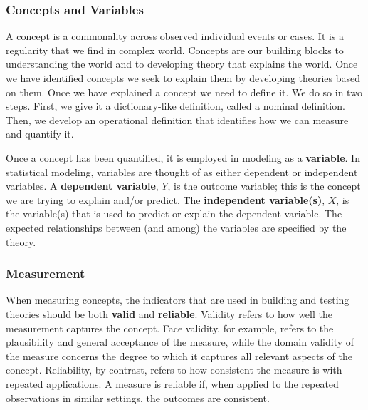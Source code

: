 \documentclass[11pt,openany]{book}\usepackage[]{graphicx}\usepackage[]{color}
\begin{document}
\subsubsection{Concepts and Variables}
A concept is a commonality across observed individual events or cases. It is a regularity that we find in complex world. Concepts are our  building blocks to understanding the world and to developing theory that explains the world. Once we have identified concepts  we seek to explain them by developing theories based on them. Once we have explained a concept we need to define it. We do so in two steps. First, we give it a dictionary-like definition, called a nominal definition. Then, we develop an operational definition that identifies how we can measure and quantify it. 

Once a concept has been quantified, it is employed in modeling as a \textbf{variable}. In statistical modeling, variables are thought of as either dependent or independent variables. A \textbf{dependent variable}, $Y$, is the outcome variable; this is the concept we are trying to explain and/or predict. The \textbf{independent variable(s)}, $X$, is the variable(s) that is used to predict or explain the dependent variable. The expected relationships between (and among) the variables are specified by the theory.

\subsubsection{Measurement}

When measuring concepts, the indicators that are used in building and testing theories should be both \textbf{valid} and \textbf{reliable}. Validity
refers to how well the measurement captures the concept. Face validity, for example, refers to the plausibility and general acceptance of the measure, while the domain validity of the measure concerns the degree to which it captures all relevant aspects of the concept. Reliability, by contrast, refers to how consistent the measure is with repeated applications. A measure is reliable if, when applied to the repeated observations in similar settings, the outcomes are consistent.
\end{document}
